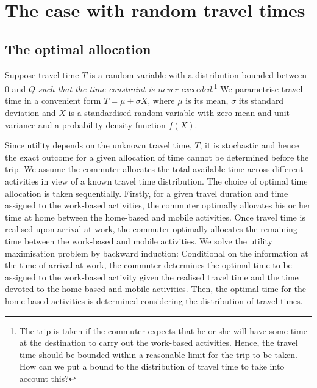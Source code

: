 \documentclass[12pt,a4paper,british]{article}
\begin{document}







\section{The case with random travel times }

\subsection{The optimal allocation}

Suppose travel time $T$ is a random variable with a distribution bounded between $0$ and $Q$ \textit{such that the time constraint is never exceeded}.\footnote{\color{red}The trip is taken if the commuter expects that he or she will have some time at the destination to carry out the work-based activities. Hence, the travel time should be bounded within a reasonable limit for the trip to be taken. How can we put a bound to the distribution of travel time to take into account this?} We parametrise travel time in a convenient form $T=\mu+\sigma X$, where $\mu$ is its mean, $\sigma$ its standard deviation and $X$ is a standardised random variable with zero mean and unit variance and a probability density function $f\left(X\right)$.

Since utility depends on the unknown travel time, $T$, it is stochastic and hence the exact outcome for a given allocation of time cannot be determined before the trip. We assume the commuter allocates the total available time across different activities in view of a known travel time distribution. The choice of optimal time allocation is taken sequentially. Firstly, for a given travel duration and time assigned to the work-based activities, the commuter optimally allocates his or her time at home between the home-based and mobile activities. Once travel time is realised upon arrival at work, the commuter optimally allocates the remaining time between the work-based and mobile activities. We solve the utility maximisation problem by backward induction: Conditional on the information at the time of arrival at work, the commuter determines the optimal time to be assigned to the work-based activity given the realised travel time and the time devoted to the home-based and mobile activities. Then, the optimal time for the home-based activities is determined considering the distribution of travel times.
\end{document}

